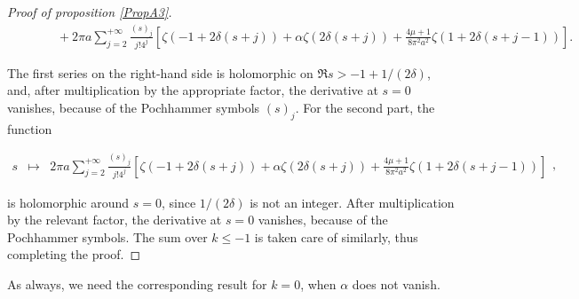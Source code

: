 \documentclass{jams-l}
\theoremstyle{definition}
\theoremstyle{remark}
\numberwithin{equation}{section}
\begin{document}
\begin{proof}[Proof of proposition \ref{PropA3}]
\[\begin{array}{lll}
                        && \qquad \scriptstyle + 2 \pi a \sum\limits_{j = 2}^{+ \infty} \frac{\left( s \right)_j}{j! 4^{j}} \left[ \zeta \left( - 1 + 2 \delta \left( s+j \right) \right) + \alpha \zeta \left( 2 \delta \left( s + j \right) \right) + \frac{4 \mu + 1}{8 \pi^2 a^2} \zeta \left( 1 + 2 \delta \left( s + j - 1 \right) \right) \right].
                    \end{array} \]
                
                \noindent The first series on the right-hand side is holomorphic on $\Re s > -1 + 1/ \left( 2 \delta \right)$, and, after multiplication by the appropriate factor, the derivative at $s=0$ vanishes, because of the Pochhammer symbols $\left( s \right)_j$. For the second part, the function
                
                \[ \begin{array}{lll}
                        \scriptstyle s & \scriptstyle \longmapsto & \scriptstyle 2 \pi a \sum\limits_{j = 2}^{+ \infty} \frac{\left( s \right)_j}{j! 4^{j}} \left[ \zeta \left( - 1 + 2 \delta \left( s+j \right) \right) + \alpha \zeta \left( 2 \delta \left( s + j \right) \right) + \frac{4 \mu + 1}{8 \pi^2 a^2} \zeta \left( 1 + 2 \delta \left( s + j - 1 \right) \right) \right]
                    \end{array} , \]
                
                \noindent is holomorphic around $s=0$, since $1/\left( 2 \delta \right)$ is not an integer. After multiplication by the relevant factor, the derivative at $s=0$ vanishes, because of the Pochhammer symbols. The sum over $k \leqslant -1$ is taken care of similarly, thus completing the proof.
            
            \end{proof}
            
            As always, we need the corresponding result for $k=0$, when $\alpha$ does not vanish.
            
\end{document}
